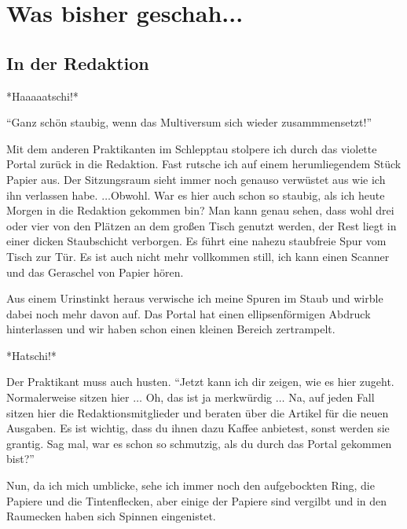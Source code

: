 \documentclass[final]{multiversum}
\begin{document}
\makemultititle
%

\section{Was bisher geschah...}


\subsection{In der Redaktion}
*Haaaaatschi!*

\enquote{Ganz schön staubig, wenn das Multiversum sich wieder zusammmensetzt!}

Mit dem anderen Praktikanten im Schlepptau stolpere ich durch das violette Portal zurück in die Redaktion.
Fast rutsche ich auf einem herumliegendem Stück Papier aus.
Der Sitzungsraum sieht immer noch genauso verwüstet aus wie ich ihn verlassen habe.
$\dots$Obwohl.
War es hier auch schon so staubig, als ich heute Morgen in die Redaktion gekommen bin? 
Man kann genau sehen, dass wohl drei oder vier von den Plätzen an dem großen Tisch genutzt werden, der Rest liegt in einer dicken Staubschicht verborgen.
Es führt eine nahezu staubfreie Spur vom Tisch zur Tür.
Es ist auch nicht mehr vollkommen still, ich kann einen Scanner und das Geraschel von Papier hören.

Aus einem Urinstinkt heraus verwische ich meine Spuren im Staub und wirble dabei noch mehr davon auf. 
Das Portal hat einen ellipsenförmigen Abdruck hinterlassen und wir haben schon einen kleinen Bereich zertrampelt.

*Hatschi!*

Der Praktikant muss auch husten.
\enquote{Jetzt kann ich dir zeigen, wie es hier zugeht.
Normalerweise sitzen hier $\dots$ 
Oh, das ist ja merkwürdig $\dots$ 
Na, auf jeden Fall sitzen hier die Redaktionsmitglieder und beraten über die Artikel für die neuen Ausgaben.
Es ist wichtig, dass du ihnen dazu Kaffee anbietest, sonst werden sie grantig.
Sag mal, war es schon so schmutzig, als du durch das Portal gekommen bist?}

Nun, da ich mich umblicke, sehe ich immer noch den aufgebockten Ring, die Papiere und die Tintenflecken, aber einige der Papiere sind vergilbt und in den Raumecken haben sich Spinnen eingenistet.
\end{document}
